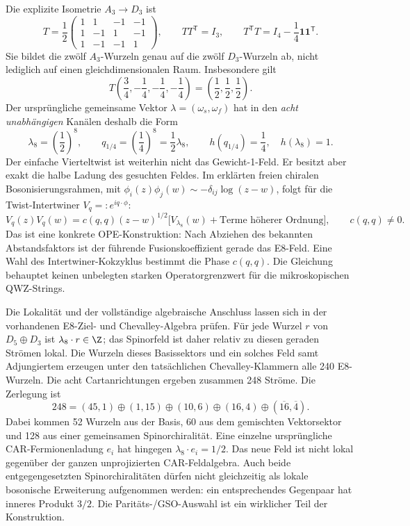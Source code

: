 Die explizite Isometrie $A_3\to D_3$ ist
\begin{equation}\label{eq:a3d3twistisometry}
 T=\frac12
 \begin{pmatrix}
 1&1&-1&-1\\
 1&-1&1&-1\\
 1&-1&-1&1
 \end{pmatrix},\qquad
 TT^{\mathsf T}=I_3,\qquad
 T^{\mathsf T}T=I_4-\frac14\mathbf1\mathbf1^{\mathsf T}.
\end{equation}
Sie bildet die zwölf $A_3$-Wurzeln genau auf die zwölf $D_3$-Wurzeln ab, nicht lediglich auf einen gleichdimensionalen Raum. Insbesondere gilt
\[
 T\left(\frac34,-\frac14,-\frac14,-\frac14\right)
   =\left(\frac12,\frac12,\frac12\right).
\]
Der ursprüngliche gemeinsame Vektor $\lambda=(\omega_s,\omega_f)$ hat in den \emph{acht unabhängigen} Kanälen deshalb die Form
\begin{equation}\label{eq:twistdoublecharge}
 \lambda_{8}=\left(\frac12\right)^8,
 \qquad q_{1/4}=\left(\frac14\right)^8=\frac12\lambda_8,
 \qquad h(q_{1/4})=\frac14,\quad h(\lambda_8)=1.
\end{equation}
Der einfache Vierteltwist ist weiterhin nicht das Gewicht-1-Feld. Er besitzt aber exakt die halbe Ladung des gesuchten Feldes. Im erklärten freien chiralen Bosonisierungsrahmen, mit $\phi_i(z)\phi_j(w)\sim-\delta_{ij}\log(z-w)$, folgt für die Twist-Intertwiner $V_q=:\!e^{iq\cdot\phi}\!:$
\begin{equation}\label{eq:doubletwistope}
 V_q(z)V_q(w)
 =c(q,q)(z-w)^{1/2}
 \bigl[V_{\lambda_8}(w)+\text{Terme höherer Ordnung}\bigr],
 \qquad c(q,q)\ne0.
\end{equation}
Das ist eine konkrete OPE-Konstruktion: Nach Abziehen des bekannten Abstandsfaktors ist der führende Fusionskoeffizient gerade das E8-Feld. Eine Wahl des Intertwiner-Kokzyklus bestimmt die Phase $c(q,q)$. Die Gleichung behauptet keinen unbelegten starken Operatorgrenzwert für die mikroskopischen QWZ-Strings.

Die Lokalität und der vollständige algebraische Anschluss lassen sich in der vorhandenen E8-Ziel- und Chevalley-Algebra prüfen. Für jede Wurzel $r$ von $D_5\oplus D_3$ ist $\lambda_8\cdot r\in\Z$; das Spinorfeld ist daher relativ zu diesen geraden Strömen lokal. Die Wurzeln dieses Basissektors und ein solches Feld samt Adjungiertem erzeugen unter den tatsächlichen Chevalley-Klammern alle 240 E8-Wurzeln. Die acht Cartanrichtungen ergeben zusammen 248 Ströme. Die Zerlegung ist
\[
 248=(45,1)\oplus(1,15)\oplus(10,6)
      \oplus(16,4)\oplus(\overline{16},\overline4).
\]
Dabei kommen 52 Wurzeln aus der Basis, 60 aus dem gemischten Vektorsektor und 128 aus einer gemeinsamen Spinorchiralität. Eine einzelne ursprüngliche CAR-Fermionenladung $e_i$ hat hingegen $\lambda_8\cdot e_i=1/2$. Das neue Feld ist nicht lokal gegenüber der ganzen unprojizierten CAR-Feldalgebra. Auch beide entgegengesetzten Spinorchiralitäten dürfen nicht gleichzeitig als lokale bosonische Erweiterung aufgenommen werden: ein entsprechendes Gegenpaar hat inneres Produkt $3/2$. Die Paritäts-/GSO-Auswahl ist ein wirklicher Teil der Konstruktion.

